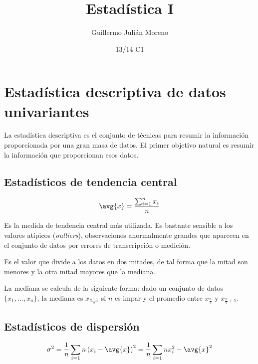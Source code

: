 \documentclass{apuntes}
\author{Guillermo Julián Moreno}
\date{13/14 C1}
\title{Estadística I}
\begin{document}
\pagestyle{plain}
\maketitle

\tableofcontents
\newpage

\section{Estadística descriptiva de datos univariantes}

La estadística descriptiva es el conjunto de técnicas para resumir la información proporcionada por una gran masa de datos. El primer objetivo natural es resumir la información que proporcionan esos datos.

\subsection{Estadísticos de tendencia central}
 
\begin{defn}[Media]

\[ \avg{x} = \frac{\sum_{i=1}^n x_i}{n} \]

Es la medida de tendencia central más utilizada. Es bastante sensible a los valores atípicos (\textit{outliers}), observaciones anormalmente grandes que aparecen en el conjunto de datos por errores de transcripción o medición.

\end{defn}

\begin{defn}[Mediana]
Es el valor que divide a los datos en dos mitades, de tal forma que la mitad son menores y la otra mitad mayores que la mediana. 

La mediana se calcula de la siguiente forma: dado un conjunto de datos $\{x_1,\dotsc, x_n\}$, la mediana es $x_{\frac{n+1}{2}}$ si $n$ es impar y  el promedio entre $x_{\frac{n}{2}}$ y $x_{\frac{n}{2} + 1}$.
\end{defn} 

\subsection{Estadísticos de dispersión}

\begin{defn}[Varianza]
\[ \sigma^2 = \frac{1}{n} \sum_{i=1}n \left(x_i - \avg{x}\right)^2 = \frac{1}{n} \sum_{i=1}n x_i^2 - \avg{x}^2 \]
\end{defn}
\end{document}
